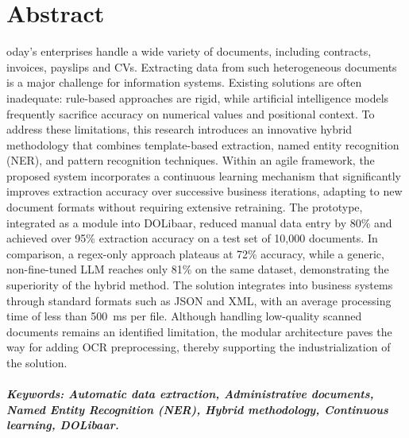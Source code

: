 %
%
%

\chapter*{Abstract}
oday's enterprises handle a wide variety of documents, including contracts, invoices, payslips and CVs. Extracting data from such heterogeneous documents is a major challenge for information systems. Existing solutions are often inadequate: rule-based approaches are rigid, while artificial intelligence models frequently sacrifice accuracy on numerical values and positional context. To address these limitations, this research introduces an innovative hybrid methodology that combines template-based extraction, named entity recognition (NER), and pattern recognition techniques. Within an agile framework, the proposed system incorporates a continuous learning mechanism that significantly improves extraction accuracy over successive business iterations, adapting to new document formats without requiring extensive retraining. The prototype, integrated as a module into DOLibaar, reduced manual data entry by 80\% and achieved over 95\% extraction accuracy on a test set of 10,000 documents. In comparison, a regex-only approach plateaus at 72\% accuracy, while a generic, non-fine-tuned LLM reaches only 81\% on the same dataset, demonstrating the superiority of the hybrid method. The solution integrates into business systems through standard formats such as JSON and XML, with an average processing time of less than 500~ms per file. Although handling low-quality scanned documents remains an identified limitation, the modular architecture paves the way for adding OCR preprocessing, thereby supporting the industrialization of the solution.
\paragraph{Keywords: Automatic data extraction, Administrative documents, Named Entity Recognition (NER), Hybrid methodology, Continuous learning, DOLibaar.}

\clearpage
